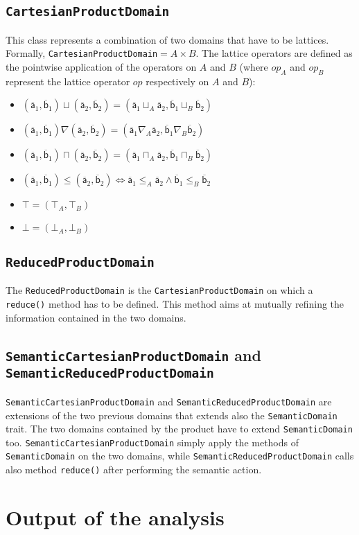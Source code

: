 \documentclass[11pt]{article}
\newcommand{\statement}[1]{\lstinline{#1}}
\newcommand{\cfunction}[1]{\ensuremath{\mathit{#1}}}
\newcommand{\cel}[1]{\ensuremath{\mathsf{#1}}}
\newcommand{\ael}[1]{\cel{\overline{#1}}}
\begin{document}
\subsection{\statement{CartesianProductDomain}}
This class represents a combination of two domains that have to be lattices. Formally, \statement{CartesianProductDomain}$=A \times B$. The lattice operators are defined as the pointwise application of the operators on $A$ and $B$ (where $\cfunction{op}_A$ and $\cfunction{op}_B$ represent the lattice operator $\cfunction{op}$ respectively on $A$ and $B$):

\begin{itemize}
\item $(\ael{a}_1, \ael{b}_1) \sqcup (\ael{a}_2, \ael{b}_2) = (\ael{a}_1 \sqcup_A \ael{a}_2, \ael{b}_1 \sqcup_B \ael{b}_2)$
\item $(\ael{a}_1, \ael{b}_1) \nabla (\ael{a}_2, \ael{b}_2) = (\ael{a}_1 \nabla_A \ael{a}_2, \ael{b}_1 \nabla_B \ael{b}_2)$
\item $(\ael{a}_1, \ael{b}_1) \sqcap (\ael{a}_2, \ael{b}_2) = (\ael{a}_1 \sqcap_A \ael{a}_2, \ael{b}_1 \sqcap_B \ael{b}_2)$
\item $(\ael{a}_1, \ael{b}_1) \leq (\ael{a}_2, \ael{b}_2) \Leftrightarrow \ael{a}_1 \leq_A \ael{a}_2 \land \ael{b}_1 \leq_B \ael{b}_2$
\item $\top = (\top_A, \top_B)$
\item $\bot = (\bot_A, \bot_B)$
\end{itemize}

\subsection{\statement{ReducedProductDomain}}
The \statement{ReducedProductDomain} is the \statement{CartesianProductDomain} on which a \statement{reduce()} method has to be defined. This method aims at mutually refining the information contained in the two domains.

\subsection{\statement{SemanticCartesianProductDomain} and \statement{SemanticReducedProductDomain}}
\statement{SemanticCartesianProductDomain} and \statement{SemanticReducedProductDomain} are extensions of the two previous domains that extends also the \statement{SemanticDomain} trait. The two domains contained by the product have to extend \statement{SemanticDomain} too. \statement{SemanticCartesianProductDomain} simply apply the methods of \statement{SemanticDomain} on the two domains, while \statement{SemanticReducedProductDomain} calls also method \statement{reduce()} after performing the semantic action.


\section{Output of the analysis}
\end{document}
